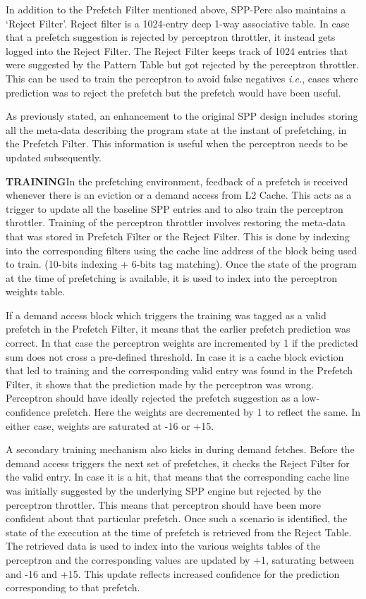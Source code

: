 In addition to the Prefetch Filter mentioned above, SPP-Perc also
maintains a `Reject Filter'.  Reject filter is a 1024-entry deep 1-way
associative table.  In case that a prefetch suggestion is rejected by
perceptron throttler, it instead gets logged into the Reject Filter.
The Reject Filter keeps track of 1024 entries that were suggested by
the Pattern Table but got rejected by the perceptron throttler.  This
can be used to train the perceptron to avoid false negatives
\textit{i.e.}, cases where prediction was to reject the prefetch but
the prefetch would have been useful.

As previously stated, an enhancement to the original SPP design
includes storing all the meta-data describing the program state at the
instant of prefetching, in the Prefetch Filter.  This information is
useful when the perceptron needs to be updated subsequently.

\textbf{TRAINING}\newline In the prefetching environment, feedback of
a prefetch is received whenever there is an eviction or a demand
access from L2 Cache.  This acts as a trigger to update all the
baseline SPP entries and to also train the perceptron throttler.
Training of the perceptron throttler involves restoring the meta-data
that was stored in Prefetch Filter or the Reject Filter.  This is done
by indexing into the corresponding filters using the cache line
address of the block being used to train. (10-bits indexing + 6-bits
tag matching).  Once the state of the program at the time of
prefetching is available, it is used to index into the perceptron
weights table.

If a demand access block which triggers the training was tagged as a
valid prefetch in the Prefetch Filter, it means that the earlier
prefetch prediction was correct.  In that case the perceptron weights
are incremented by 1 if the predicted sum does not cross a pre-defined
threshold.  In case it is a cache block eviction that led to training
and the corresponding valid entry was found in the Prefetch Filter, it
shows that the prediction made by the perceptron was wrong.
Perceptron should have ideally rejected the prefetch suggestion as a
low-confidence prefetch.  Here the weights are decremented by 1 to
reflect the same.  In either case, weights are saturated at -16 or
+15.

A secondary training mechanism also kicks in during demand fetches.
Before the demand access triggers the next set of prefetches, it
checks the Reject Filter for the valid entry.  In case it is a hit,
that means that the corresponding cache line was initially suggested
by the underlying SPP engine but rejected by the perceptron throttler.
This means that perceptron should have been more confident about that
particular prefetch.  Once such a scenario is identified, the state of
the execution at the time of prefetch is retrieved from the Reject
Table.  The retrieved data is used to index into the various weights
tables of the perceptron and the corresponding values are updated by
+1, saturating between and -16 and +15.  This update reflects
increased confidence for the prediction corresponding to that
prefetch.

